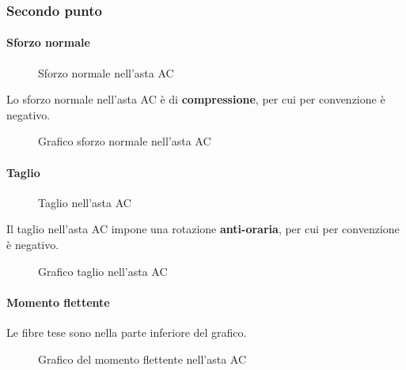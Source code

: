 \documentclass[main.tex]{subfiles}
\begin{document}
\subsubsection{Secondo punto}
\paragraph{Sforzo normale}

\begin{figure}[H]
\centering
\resizebox{.5\textwidth}{!}{}
\caption{Sforzo normale nell'asta AC}
\end{figure}

Lo sforzo normale nell'asta AC è di \textbf{compressione}, per cui per convenzione è negativo.

\begin{figure}[H]
\centering
\resizebox{.5\textwidth}{!}{}
\caption{Grafico sforzo normale nell'asta AC}
\end{figure}

\paragraph{Taglio}

\begin{figure}[H]
\centering
\resizebox{.5\textwidth}{!}{}
\caption{Taglio nell'asta AC}
\end{figure}

Il taglio nell'asta AC impone una rotazione \textbf{anti-oraria}, per cui per convenzione è negativo.

\begin{figure}[H]
\centering
\resizebox{.5\textwidth}{!}{}
\caption{Grafico taglio nell'asta AC}
\end{figure}

\paragraph{Momento flettente}

Le fibre tese sono nella parte inferiore del grafico.

\begin{figure}[H]
\centering
\resizebox{.5\textwidth}{!}{}
\caption{Grafico del momento flettente nell'asta AC}
\end{figure}
\end{document}
